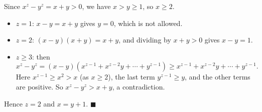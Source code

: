Since $x^z-y^z=x+y>0$, we have $x>y\ge1$, so $x\ge2$.
\begin{itemize}
\item $z=1$: $x-y=x+y$ gives $y=0$, which is not allowed.
\item $z=2$: $(x-y)(x+y)=x+y$, and dividing by $x+y>0$ gives $x-y=1$.
\item $z\ge3$: then
\[x^z-y^z=(x-y)\left(x^{z-1}+x^{z-2}y+\cdots+y^{z-1}\right)\ge x^{z-1}+x^{z-2}y+\cdots+y^{z-1}.\]
Here $x^{z-1}\ge x^2>x$ (as $x\ge2$), the last term $y^{z-1}\ge y$, and the other terms are positive. So $x^z-y^z>x+y$, a contradiction.
\end{itemize}
Hence $z=2$ and $x=y+1$. $\blacksquare$
